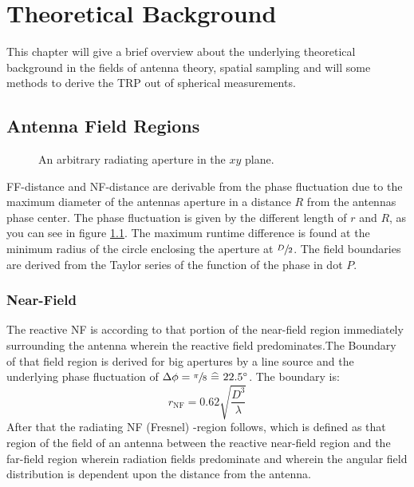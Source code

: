 \chapter{Theoretical Background}

This chapter will give a brief overview about the underlying theoretical background in the fields of antenna theory, spatial sampling and will some methods to derive the \ac{TRP} out of spherical measurements.

\section{Antenna Field Regions}
\begin{figure}[H]
\centering
\def\svgwidth{0.6\textwidth}

\caption{An arbitrary radiating aperture in the $xy$ plane. \cite{7942128}}
\label{arbaperturexy}
\end{figure}

\ac{FF}-distance and \ac{NF}-distance are derivable from the phase fluctuation due to the maximum diameter of the antennas aperture \cite{7942128} in a distance $R$ from the antennas phase center. The phase fluctuation is given by the different length of $r$ and $R$, as you can see in figure \ref{arbaperturexy}. The maximum runtime difference is found at the minimum radius of the circle enclosing the aperture at $\sfrac{D}{2}$. The field boundaries are derived from the Taylor series of the function of the phase in dot $P$. \cite{7942128}


\subsection{Near-Field}

The reactive \acf{NF} is according to \cite{balanis} \glqq that portion of the near-field region immediately surrounding the antenna wherein the reactive field predominates.\grqq{ }The Boundary of that field region is derived for big apertures by a line source and the underlying phase fluctuation of  $\Delta\phi = \sfrac{\pi}{8} \ \widehat{=}\  22.5^\circ$. The boundary is:
\begin{equation}
r_{\text{NF}} = 0.62\sqrt{\frac{D^3}{\lambda}}
\end{equation}
After that the radiating \ac{NF} (Fresnel) -region follows, which is defined as \glqq that region of the field of an antenna between the reactive near-field region and the far-field region wherein radiation fields predominate and wherein the angular field distribution is dependent upon the distance from the antenna.\grqq

